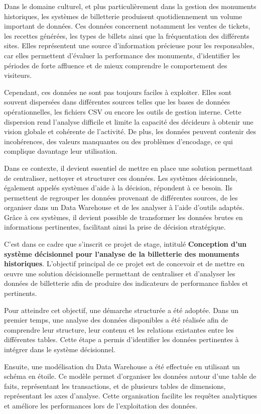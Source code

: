 \documentclass[12pt,a4paper]{report}
\begin{document}
Dans le domaine culturel, et plus particulièrement dans la gestion des monuments historiques, les systèmes de billetterie produisent quotidiennement un volume important de données. Ces données concernent notamment les ventes de tickets, les recettes générées, les types de billets ainsi que la fréquentation des différents sites. Elles représentent une source d’information précieuse pour les responsables, car elles permettent d’évaluer la performance des monuments, d’identifier les périodes de forte affluence et de mieux comprendre le comportement des visiteurs.

Cependant, ces données ne sont pas toujours faciles à exploiter. Elles sont souvent dispersées dans différentes sources telles que les bases de données opérationnelles, les fichiers CSV ou encore les outils de gestion interne. Cette dispersion rend l’analyse difficile et limite la capacité des décideurs à obtenir une vision globale et cohérente de l’activité. De plus, les données peuvent contenir des incohérences, des valeurs manquantes ou des problèmes d’encodage, ce qui complique davantage leur utilisation.

Dans ce contexte, il devient essentiel de mettre en place une solution permettant de centraliser, nettoyer et structurer ces données. Les systèmes décisionnels, également appelés systèmes d’aide à la décision, répondent à ce besoin. Ils permettent de regrouper les données provenant de différentes sources, de les organiser dans un Data Warehouse et de les analyser à l’aide d’outils adaptés. Grâce à ces systèmes, il devient possible de transformer les données brutes en informations pertinentes, facilitant ainsi la prise de décision stratégique.

C’est dans ce cadre que s’inscrit ce projet de stage, intitulé \textbf{Conception d’un système décisionnel pour l’analyse de la billetterie des monuments historiques}. L’objectif principal de ce projet est de concevoir et de mettre en œuvre une solution décisionnelle permettant de centraliser et d’analyser les données de billetterie afin de produire des indicateurs de performance fiables et pertinents.

Pour atteindre cet objectif, une démarche structurée a été adoptée. Dans un premier temps, une analyse des données disponibles a été réalisée afin de comprendre leur structure, leur contenu et les relations existantes entre les différentes tables. Cette étape a permis d’identifier les données pertinentes à intégrer dans le système décisionnel.

Ensuite, une modélisation du Data Warehouse a été effectuée en utilisant un schéma en étoile. Ce modèle permet d’organiser les données autour d’une table de faits, représentant les transactions, et de plusieurs tables de dimensions, représentant les axes d’analyse. Cette organisation facilite les requêtes analytiques et améliore les performances lors de l’exploitation des données.
\end{document}
